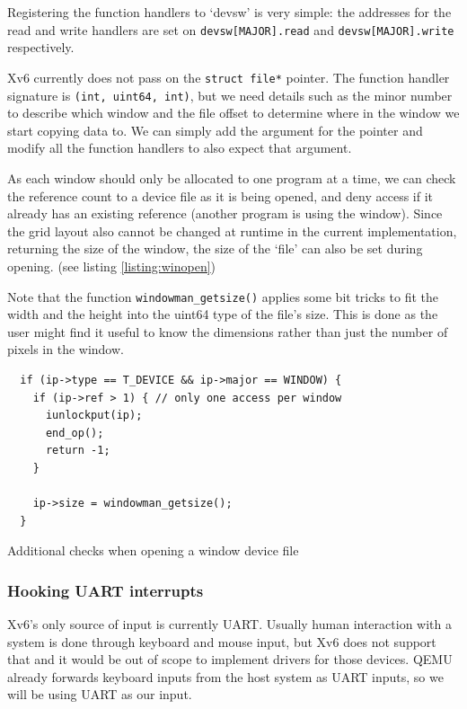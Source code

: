 Registering the function handlers to `devsw' is very simple: the addresses for
the read and write handlers are set on
\texttt{devsw[MAJOR].read} and 
\texttt{devsw[MAJOR].write} respectively.

Xv6 currently does not pass on the \texttt{struct file*} pointer.
The function handler signature is \texttt{(int, uint64, int)}, but we need
details such as the minor number to describe which window and 
the file offset to determine where in the window we start copying data to. We can
simply add the argument for the pointer and modify all the function handlers to 
also expect that argument.

As each window should only be allocated to one program at a time, we can check the
reference count to a device file as it is being opened, and deny access if it already
has an existing reference (another program is using the window).
Since the grid layout also cannot be changed at runtime in the current implementation,
returning the size of the window, the size of the `file' can also be set during opening.
(see listing \ref{listing:winopen})

Note that the function \texttt{windowman_getsize()} applies some bit tricks
to fit the width and the height into the uint64 type of the file's size. This is done
as the user might find it useful to know the dimensions rather than just the
number of pixels in the window.

\begin{listing}
    \begin{verbatim}
  if (ip->type == T_DEVICE && ip->major == WINDOW) {
    if (ip->ref > 1) { // only one access per window
      iunlockput(ip);
      end_op();
      return -1;
    }

    ip->size = windowman_getsize();
  }
    \end{verbatim}
    \caption{Additional checks when opening a window device file}
    \label{listing:winopen}
\end{listing}

\subsubsection{Hooking UART interrupts}
Xv6's only source of input is currently UART. Usually human interaction with
a system is done through keyboard and mouse input, but Xv6 does not support that
and it would be out of scope to implement drivers for those devices. QEMU already
forwards keyboard inputs from the host system as UART inputs, so we will be using
UART as our input.

